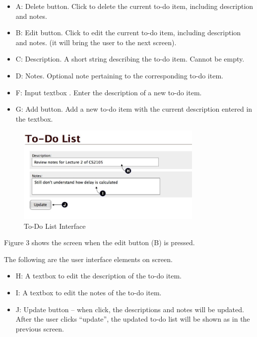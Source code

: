 \documentclass[a4paper,11pt]{exam}
\begin{document}
\begin{itemize}
	\item A: Delete button. Click to delete the current to-do item, including description and notes.
	\item B: Edit button. Click to edit the current to-do item, including description and notes. (it will bring the user to the next screen).
	\item C: Description. A short string describing the to-do item. Cannot be empty.
	\item D: Notes. Optional note pertaining to the corresponding to-do item.
	\item F: Input textbox . Enter the description of a new to-do item.
	\item G: Add button. Add a new to-do item with the current description entered in the textbox.
\end{itemize}

\begin{figure}
\begin{center}
	\includegraphics[width=0.8\textwidth]{todo-edit.jpg}
\end{center}
\caption{To-Do List Interface}
\end{figure}

Figure 3 shows the screen when the edit button (B) is pressed.


The following are the user interface elements on screen.

\begin{itemize}
	\item H: A textbox to edit the description of the to-do item.
	\item I: A textbox to edit the notes of the to-do item.
	\item J: Update button -- when click, the descriptions and notes will be updated. After the user clicks ``update'', the updated to-do list will be shown as in the previous screen.
\end{itemize}
\end{document}
